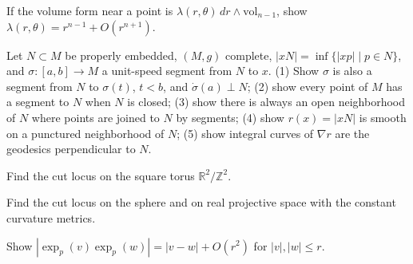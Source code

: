 \begin{remark}
  \label{rem:pet-ch5-ex-22}
  If the volume form near a point is $\lambda(r,\theta)\,dr\wedge\mathrm{vol}_{n-1}$,
  show $\lambda(r,\theta)=r^{n-1}+O(r^{n+1})$.
\end{remark}

\begin{remark}
  \label{rem:pet-ch5-ex-23}
  Let $N\subset M$ be properly embedded, $(M,g)$ complete, $|xN|=\inf\{|xp|\mid
  p\in N\}$, and $\sigma:[a,b]\to M$ a unit-speed segment from $N$ to $x$. (1) Show
  $\sigma$ is also a segment from $N$ to $\sigma(t)$, $t<b$, and $\dot\sigma(a)\perp
  N$; (2) show every point of $M$ has a segment to $N$ when $N$ is closed; (3) show
  there is always an open neighborhood of $N$ where points are joined to $N$ by
  segments; (4) show $r(x)=|xN|$ is smooth on a punctured neighborhood of $N$; (5)
  show integral curves of $\nabla r$ are the geodesics perpendicular to $N$.
\end{remark}

\begin{remark}
  \label{rem:pet-ch5-ex-24}
  Find the cut locus on the square torus $\mathbb R^2/\mathbb Z^2$.
\end{remark}

\begin{remark}
  \label{rem:pet-ch5-ex-25}
  Find the cut locus on the sphere and on real projective space with the constant
  curvature metrics.
\end{remark}

\begin{remark}
  \label{rem:pet-ch5-ex-26}
  Show $|\exp_p(v)\exp_p(w)|=|v-w|+O(r^2)$ for $|v|,|w|\le r$.
\end{remark}

